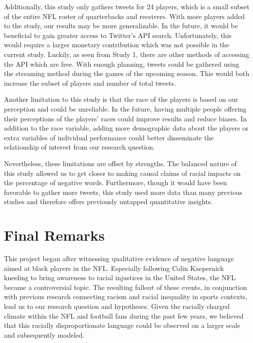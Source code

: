 \documentclass[12pt,twoside]{reedthesis}
\begin{document}
Additionally, this study only gathers tweets for 24 players, which is a
small subset of the entire NFL roster of quarterbacks and receivers.
With more players added to the study, our results may be more
generalizable. In the future, it would be beneficial to gain greater
access to Twitter's API search. Unfortunately, this would require a
larger monetary contribution which was not possible in the current
study. Luckily, as seen from Study 1, there are other methods of
accessing the API which are free. With enough planning, tweets could be
gathered using the streaming method during the games of the upcoming
season. This would both increase the subset of players and number of
total tweets.

Another limitation to this study is that the race of the players is
based on our perception and could be unreliable. In the future, having
multiple people offering their perceptions of the players' races could
improve results and reduce biases. In addition to the race variable,
adding more demographic data about the players or extra variables of
individual performance could better disseminate the relationship of
interest from our research question.

Nevertheless, these limitations are offset by strengths. The balanced
nature of this study allowed us to get closer to making causal claims of
racial impacts on the percentage of negative words. Furthermore, though
it would have been favorable to gather more tweets, this study used more
data than many previous studies and therefore offers previously untapped
quantitative insights.

\chapter{Final Remarks}\label{final-remarks}

This project began after witnessing qualitative evidence of negative
language aimed at black players in the NFL. Especially following Colin
Kaepernick kneeling to bring awareness to racial injustices in the
United States, the NFL became a controversial topic. The resulting
fallout of these events, in conjunction with previous research
connecting racism and racial inequality in sports contexts, lead us to
our research question and hypotheses. Given the racially charged climate
within the NFL and football fans during the past few years, we believed
that this racially disproportionate language could be observed on a
larger scale and subsequently modeled.
\end{document}
